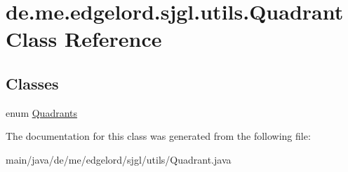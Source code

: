 \hypertarget{classde_1_1me_1_1edgelord_1_1sjgl_1_1utils_1_1_quadrant}{}\section{de.\+me.\+edgelord.\+sjgl.\+utils.\+Quadrant Class Reference}
\label{classde_1_1me_1_1edgelord_1_1sjgl_1_1utils_1_1_quadrant}
\subsection*{Classes}
\begin{DoxyCompactItemize}
\item 
enum \mbox{\hyperlink{enumde_1_1me_1_1edgelord_1_1sjgl_1_1utils_1_1_quadrant_1_1_quadrants}{Quadrants}}
\end{DoxyCompactItemize}


The documentation for this class was generated from the following file\+:\begin{DoxyCompactItemize}
\item 
main/java/de/me/edgelord/sjgl/utils/Quadrant.\+java\end{DoxyCompactItemize}
